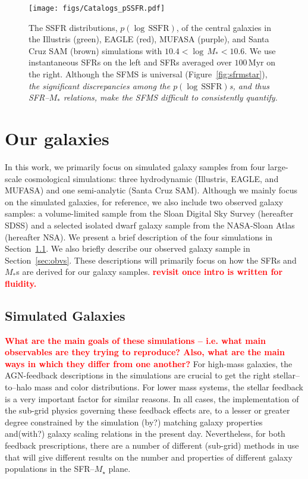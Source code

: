 \documentclass[preprint2,tighten]{aastex62}
\newcommand{\todo}[1]{{\bf \textcolor{red}{ #1}}}
\begin{document}
\begin{figure}
\begin{center}
\texttt{[image: figs/Catalogs\_pSSFR.pdf]} 
\caption{The SSFR distributions, $p(\log\,\mathrm{SSFR})$, of the 
central galaxies in the Illustris (green), 
EAGLE (red),  MUFASA (purple), and  Santa Cruz SAM (brown) simulations 
with $10.4 < \log\,M_* < 10.6$. We use instantaneous SFRs on the left
and SFRs averaged over $100\,\mathrm{Myr}$ on the right. Although the
SFMS is universal (Figure~\ref{fig:sfrmstar}), 
\emph{the significant discrepancies among the $p(\log\,\mathrm{SSFR})$s,
and thus SFR--$M_*$ relations, make the SFMS difficult to consistently 
quantify.}} \label{fig:pssfr}
\end{center}
\end{figure}

\section{Our galaxies} \label{sec:ourgals}
In this work, we primarily focus on simulated galaxy samples from four 
large-scale cosmological simulations: three hydrodynamic (Illustris, EAGLE, 
and MUFASA) and one semi-analytic (Santa Cruz SAM). Although we mainly 
focus on the simulated galaxies, for reference, we also include two observed 
galaxy samples: a volume-limited sample from the Sloan Digital Sky Survey 
(hereafter SDSS) and a selected isolated dwarf galaxy sample from the 
NASA-Sloan Atlas (hereafter NSA). We present a brief description of the
four simulations in Section~\ref{sec:galsims}. We also briefly
describe our observed galaxy sample in Section~\ref{sec:obvs}. These 
descriptions will primarily focus on how the SFRs and $M_*$s are derived
for our galaxy samples. 
\todo{revisit once intro is written for fluidity.}

\subsection{Simulated Galaxies} \label{sec:galsims}
\todo{What are the main goals of these simulations -- i.e. what main observables are they trying to reproduce? Also, what are the main ways in which they differ from one another?}
For high-mass galaxies, the AGN-feedback descriptions in the simulations are crucial to get the right stellar--to--halo mass and color distributions. 
For lower mass systems, the stellar feedback is a very important factor for similar reasons. In all cases, the implementation of the sub-grid physics governing these feedback effects are, to a lesser or greater degree constrained by the simulation (by?) matching galaxy properties and(with?) galaxy scaling relations in the present day. Nevertheless, for both feedback prescriptions, there are a number of different (sub-grid) methods in use that will give different results on the number and properties of different galaxy populations in the SFR--$M_{\star}$ plane. 
\end{document}
